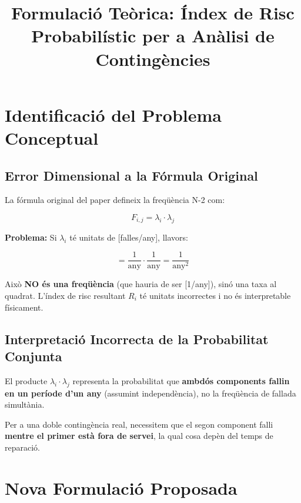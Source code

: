 \documentclass[11pt,a4paper]{article}
\title{Formulació Teòrica: Índex de Risc Probabilístic per a Anàlisi de Contingències}
\author{}
\date{}
\begin{document}
\maketitle

\tableofcontents
\newpage

\section{Identificació del Problema Conceptual}

\subsection{Error Dimensional a la Fórmula Original}

La fórmula original del paper defineix la freqüència N-2 com:

\begin{equation}
F_{i,j} = \lambda_i \cdot \lambda_j
\end{equation}

\textbf{Problema:} Si $\lambda_i$ té unitats de [falles/any], llavors:

\begin{equation}
[\lambda_i \cdot \lambda_j] = \frac{1}{\text{any}} \cdot \frac{1}{\text{any}} = \frac{1}{\text{any}^2}
\end{equation}

Això \textbf{NO és una freqüència} (que hauria de ser [1/any]), sinó una taxa al quadrat. L'índex de risc resultant $R_i$ té unitats incorrectes i no és interpretable físicament.

\subsection{Interpretació Incorrecta de la Probabilitat Conjunta}

El producte $\lambda_i \cdot \lambda_j$ representa la probabilitat que \textbf{ambdós components fallin en un període d'un any} (assumint independència), no la freqüència de fallada simultània.

Per a una doble contingència real, necessitem que el segon component falli \textbf{mentre el primer està fora de servei}, la qual cosa depèn del temps de reparació.

\section{Nova Formulació Proposada}
\end{document}
